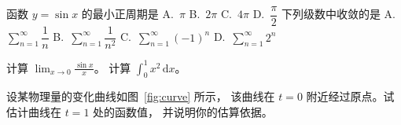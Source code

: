 \begin{examquestions}
  \examquestion 函数 $y=\sin x$ 的最小正周期是
    \quad A.\ $\pi$ \quad B.\ $2\pi$ \quad C.\ $4\pi$ \quad D.\ $\dfrac{\pi}{2}$
  \examquestion 下列级数中收敛的是
    \quad A.\ $\sum_{n=1}^{\infty}\dfrac{1}{n}$ \quad
    B.\ $\sum_{n=1}^{\infty}\dfrac{1}{n^{2}}$\quad
    C.\ $\sum_{n=1}^{\infty}(-1)^{n}$ \quad D.\ $\sum_{n=1}^{\infty}2^{n}$
\end{examquestions}

\begin{examquestions}[0pt]
  \examquestion 计算 $\displaystyle\lim_{x\to 0}\frac{\sin x}{x}$。
  \examanswerspace{7cm}
  \examquestion 计算 $\displaystyle\int_{0}^{1} x^{2}\,\mathrm{d}x$。
  \examanswerspace{7cm}
\end{examquestions}

\newpage
{}
\begin{examproblem}
  \examquestion 设某物理量的变化曲线如图~\ref{fig:curve} 所示，
  该曲线在 $t=0$ 附近经过原点。试估计曲线在 $t=1$ 处的函数值，
  并说明你的估算依据。

  \label{fig:curve}

\end{examproblem}
